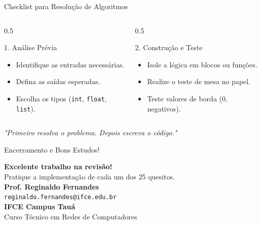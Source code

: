 \begin{frame}{Checklist para Resolução de Algoritmos}
    \begin{columns}
        \begin{column}{0.5\textwidth}
            \begin{block}{1. Análise Prévia}
                \begin{itemize}
                    \item Identifique as entradas necessárias.
                    \item Defina as saídas esperadas.
                    \item Escolha os tipos (\texttt{int}, \texttt{float}, \texttt{list}).
                \end{itemize}
            \end{block}
        \end{column}
        \begin{column}{0.5\textwidth}
            \begin{block}{2. Construção e Teste}
                \begin{itemize}
                    \item Isole a lógica em blocos ou funções.
                    \item Realize o teste de mesa no papel.
                    \item Teste valores de borda ($0$, negativos).
                \end{itemize}
            \end{block}
        \end{column}
    \end{columns}

    \vspace{0.3cm}
    \begin{center}
        \textit{"Primeiro resolva o problema. Depois escreva o código."}
    \end{center}
\end{frame}

\begin{frame}{Encerramento e Bons Estudos!}
    \begin{center}
        \LARGE \textbf{Excelente trabalho na revisão!}\\
        \vspace{0.3cm}
        \normalsize Pratique a implementação de cada um dos 25 quesitos.\\
        \vspace{0.5cm}
        \textbf{Prof. Reginaldo Fernandes}\\
        \footnotesize \texttt{reginaldo.fernandes@ifce.edu.br}\\
        \vspace{0.3cm}
        \textbf{IFCE Campus Tauá}\\
        \small Curso Técnico em Redes de Computadores
    \end{center}
\end{frame}
